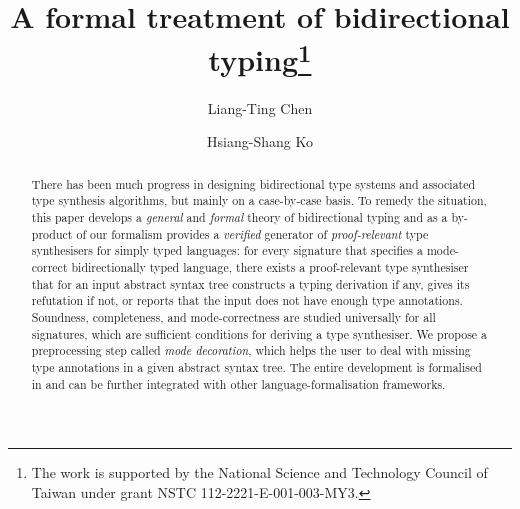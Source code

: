 \documentclass[orivec,envcountsect,envcountsame]{llncs}
\author{Liang-Ting Chen\orcidID{0000-0002-3250-1331} \and Hsiang-Shang Ko\orcidID{0000-0002-2439-1048}}
\institute{Institute of Information Science, Academia Sinica, Taiwan}
\title{A formal treatment of bidirectional typing\texorpdfstring{\thanks{The work is supported by the National Science and Technology Council of Taiwan under grant NSTC 112-2221-E-001-003-MY3.}}{}}
\numberwithin{table}{section}
\begin{document}
\maketitle

\begin{abstract}
There has been much progress in designing bidirectional type systems and associated type synthesis algorithms, but mainly on a case-by-case basis.
To remedy the situation, this paper develops a \emph{general} and \emph{formal} theory of bidirectional typing and as a by-product of our formalism provides a \emph{verified} generator of \emph{proof-relevant} type synthesisers for simply typed languages: for every signature that specifies a mode-correct bidirectionally typed language, there exists a proof-relevant type synthesiser that for an input abstract syntax tree constructs a typing derivation if any, gives its refutation if not, or reports that the input does not have enough type annotations.
Soundness, completeness, and mode-correctness are studied universally for all signatures, which are sufficient conditions for deriving a type synthesiser.
We propose a preprocessing step called \emph{mode decoration}, which helps the user to deal with missing type annotations in a given abstract syntax tree.
The entire development is formalised in \Agda and can be further integrated with other language-formalisation frameworks.
\end{abstract}












\appendix



\end{document}
